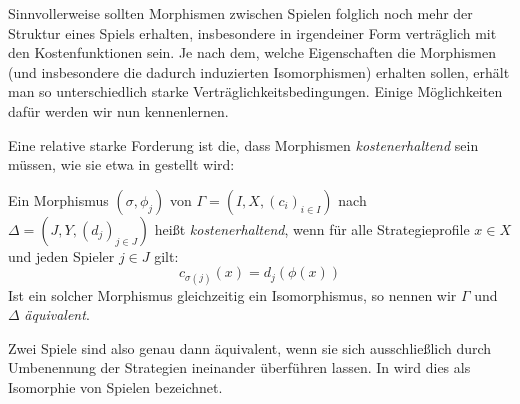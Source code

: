 Sinnvollerweise sollten Morphismen zwischen Spielen folglich noch mehr der Struktur eines Spiels erhalten, insbesondere in irgendeiner Form \glqq verträglich\grqq{} mit den Kostenfunktionen sein. Je nach dem, welche Eigenschaften die Morphismen (und insbesondere die dadurch induzierten Isomorphismen) erhalten sollen, erhält man so unterschiedlich starke Verträglichkeitsbedingungen. Einige Möglichkeiten dafür werden wir nun kennenlernen.

Eine relative starke Forderung ist die, dass Morphismen \emph{kostenerhaltend} sein müssen, wie sie etwa in \cite[Abschnitt 2.1]{ReprOfFiniteGamesAsNCG} gestellt wird:

\begin{defn}
	Ein Morphismus $(\sigma, \phi_j)$ von $\Gamma = (I, X, (c_i)_{i\in I})$ nach $\Delta = (J, Y, (d_j)_{j\in J})$ heißt \emph{kostenerhaltend}, wenn für alle Strategieprofile $x \in X$ und jeden Spieler $j \in J$ gilt:
		\[c_{\sigma(j)}(x) = d_j(\phi(x)) \]
	Ist ein solcher Morphismus gleichzeitig ein Isomorphismus, so nennen wir $\Gamma$ und $\Delta$ \emph{äquivalent}.
\end{defn}

\begin{bem}
	Zwei Spiele sind also genau dann äquivalent, wenn sie sich ausschließlich durch Umbenennung der Strategien ineinander überführen lassen. In \cite[S. 133]{MonShap} wird dies als Isomorphie von Spielen bezeichnet.
\end{bem}

